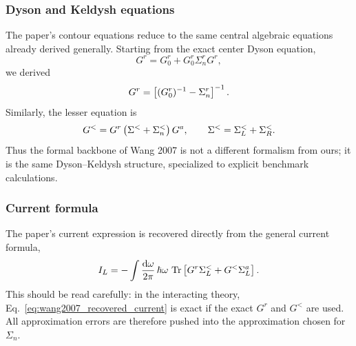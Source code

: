 \subsubsection{Dyson and Keldysh equations}
The paper's contour equations reduce to the same central algebraic equations already derived generally. Starting from the exact center Dyson equation,
\begin{equation}
    G^r = G_0^r + G_0^r\Sigma_n^r G^r,
\end{equation}
we derived
\begin{equation}
    G^r = \left[ (G_0^r)^{-1} - \Sigma_n^r \right]^{-1}.
    \label{eq:wang2007_recovered_dyson}
\end{equation}
Similarly, the lesser equation is
\begin{equation}
    G^< = G^r\left( \Sigma^< + \Sigma_n^< \right)G^a,
    \qquad
    \Sigma^< = \Sigma_L^< + \Sigma_R^<.
    \label{eq:wang2007_recovered_keldysh}
\end{equation}
Thus the formal backbone of Wang 2007 is not a different formalism from ours; it is the same Dyson--Keldysh structure, specialized to explicit benchmark calculations.

\subsubsection{Current formula}
The paper's current expression is recovered directly from the general current formula,
\begin{equation}
    I_L = -\int \frac{\mathrm{d}\omega}{2\pi}\,\hbar\omega\,\operatorname{Tr}\left[ G^r\Sigma_L^< + G^<\Sigma_L^a \right].
    \label{eq:wang2007_recovered_current}
\end{equation}
This should be read carefully: in the interacting theory, Eq.~\eqref{eq:wang2007_recovered_current} is exact if the exact $G^r$ and $G^<$ are used. All approximation errors are therefore pushed into the approximation chosen for $\Sigma_n$.

